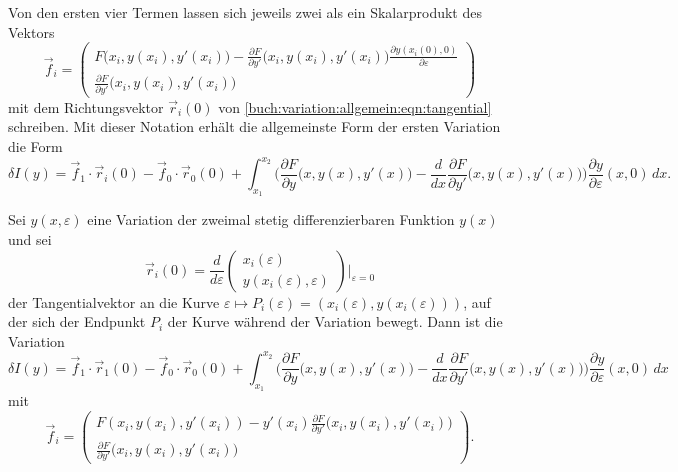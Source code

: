Von den ersten vier Termen lassen sich jeweils zwei als ein Skalarprodukt
des Vektors
\[
\vec{f}_i
=
\begin{pmatrix}
\displaystyle
F\bigl(x_i,y(x_i),y'(x_i)\bigr)
-
\frac{\partial F}{\partial y'}\bigl(x_i,y(x_i),y'(x_i)\bigr)
\frac{\partial y(x_i(0),0)}{\partial\varepsilon}
\\[3pt]
\displaystyle
\frac{\partial F}{\partial y'}\bigl(x_i,y(x_i),y'(x_i)\bigr)
\end{pmatrix}
\]
mit dem Richtungsvektor  $\vec{r}_i(0)$ von
\eqref{buch:variation:allgemein:eqn:tangential} schreiben.
Mit dieser Notation erhält die allgemeinste Form der ersten Variation
die Form
\begin{equation}
\delta I(y)
=
\vec{f}_1\cdot \vec{r}_i(0)
-
\vec{f}_0\cdot \vec{r}_0(0)
+
\int_{x_1}^{x_2}
\biggl(
\frac{\partial F}{\partial y}\bigl(x,y(x),y'(x)\bigr)
-
\frac{d}{dx}\frac{\partial F}{\partial y'}\bigl(x,y(x),y'(x)\bigr)
\biggr)
\frac{\partial y}{\partial \varepsilon}(x,0)
\,dx.
\end{equation}

\begin{satz}
\label{buch:variation:allgemein:satz:allgemeinvariation1}
Sei $y(x,\varepsilon)$ eine Variation der zweimal stetig differenzierbaren
Funktion $y(x)$ und sei
\[
\vec{r}_i(0)
=
\frac{d}{d\varepsilon}
\begin{pmatrix}
x_i(\varepsilon)\\
y(x_i(\varepsilon),\varepsilon)
\end{pmatrix}\bigg|_{\varepsilon=0}
\]
der Tangentialvektor an die Kurve
$\varepsilon\mapsto P_i(\varepsilon) = (x_i(\varepsilon),y(x_i(\varepsilon)))$,
auf der sich der Endpunkt $P_i$ der Kurve während der Variation
bewegt.
Dann ist die Variation
\begin{equation}
\delta I(y)
=
\vec{f}_1\cdot\vec{r}_1(0)
-
\vec{f}_0\cdot\vec{r}_0(0)
+
\int_{x_1}^{x_2}
\biggl(
\frac{\partial F}{\partial y}\bigl(x,y(x),y'(x)\bigr)
-
\frac{d}{dx}\frac{\partial F}{\partial y'}\bigl(x,y(x),y'(x)\bigr)
\biggr)
\frac{\partial y}{\partial \varepsilon}(x,0)
\,dx
\label{buch:variation:allgemein:eqn:allgemeinvariation1}
\end{equation}
mit
\begin{equation}
\vec{f}_i
=
\begin{pmatrix}
\displaystyle
F(x_i,y(x_i),y'(x_i))
-
y'(x_i)
\frac{\partial F}{\partial y'}\bigl(x_i,y(x_i),y'(x_i)\bigr)
\\[3pt]
\displaystyle
\frac{\partial F}{\partial y'}\bigl(x_i,y(x_i),y'(x_i)\bigr)
\end{pmatrix}.
\label{buch:nebenbedingungen:allgemein:eqn:fi}
\end{equation}
\end{satz}

